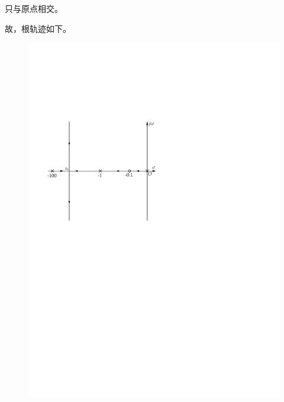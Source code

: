\begin{exercise}
\begin{enumerate}
\begin{enumerate}
            只与原点相交。
        \end{enumerate}
        故，根轨迹如下。
        \begin{figure}[H]
            \centering
            \includegraphics[scale=0.6]{figures/figure5.4.pdf}
        \end{figure}
    \end{enumerate}
\end{exercise}

\setcounter{exercise}{10}

